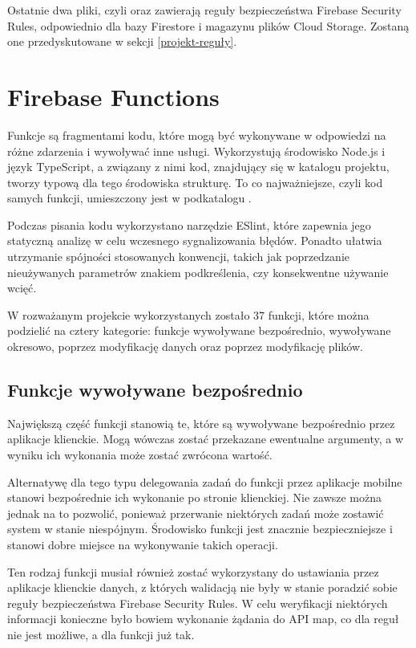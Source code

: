 Ostatnie dwa pliki, czyli  oraz  zawierają reguły bezpieczeństwa Firebase Security Rules, odpowiednio dla bazy Firestore i magazynu plików Cloud Storage. Zostaną one przedyskutowane w sekcji \ref{projekt-reguły}.

\section{Firebase Functions}
\label{projekt-funkcje}

Funkcje są fragmentami kodu, które mogą być wykonywane w odpowiedzi na różne zdarzenia i wywoływać inne usługi. Wykorzystują środowisko Node.js i język TypeScript, a związany z nimi kod, znajdujący się w katalogu  projektu, tworzy typową dla tego środowiska strukturę. To co najważniejsze, czyli kod samych funkcji, umieszczony jest w podkatalogu .

Podczas pisania kodu wykorzystano narzędzie ESlint, które zapewnia jego statyczną analizę w celu wczesnego sygnalizowania błędów. Ponadto ułatwia utrzymanie spójności stosowanych konwencji, takich jak poprzedzanie nieużywanych parametrów znakiem podkreślenia, czy konsekwentne używanie wcięć.

W rozważanym projekcie wykorzystanych zostało 37 funkcji, które można podzielić na cztery kategorie: funkcje wywoływane bezpośrednio, wywoływane okresowo, poprzez modyfikację danych oraz poprzez modyfikację plików. 

\subsection{Funkcje wywoływane bezpośrednio}

Największą część funkcji stanowią te, które są wywoływane bezpośrednio przez aplikacje klienckie. Mogą wówczas zostać przekazane ewentualne argumenty, a w wyniku ich wykonania może zostać zwrócona wartość.

Alternatywę dla tego typu delegowania zadań do funkcji przez aplikacje mobilne stanowi bezpośrednie ich wykonanie po stronie klienckiej. Nie zawsze można jednak na to pozwolić, ponieważ przerwanie niektórych zadań może zostawić system w stanie niespójnym. Środowisko funkcji jest znacznie bezpieczniejsze i stanowi dobre miejsce na wykonywanie takich operacji. 

Ten rodzaj funkcji musiał również zostać wykorzystany do ustawiania przez aplikacje klienckie danych, z których walidacją nie były w stanie poradzić sobie reguły bezpieczeństwa Firebase Security Rules. W celu weryfikacji niektórych informacji konieczne było bowiem wykonanie żądania do API map, co dla reguł nie jest możliwe, a dla funkcji już tak. 

